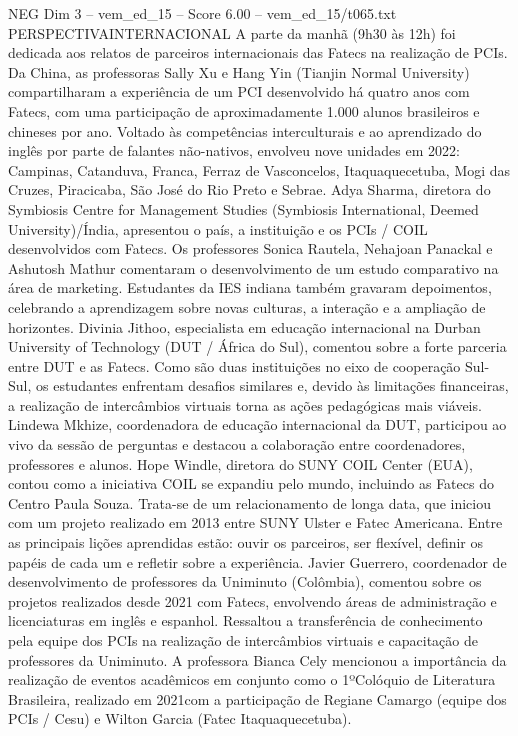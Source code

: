 \begin{textsample}{NEG Dim 3 – vem\_ed\_15 – Score 6.00 – vem\_ed\_15/t065.txt}  \label{ex:f3_neg_112}
PERSPECTIVAINTERNACIONAL A parte da manhã (9h30 às 12h) foi dedicada aos relatos de parceiros internacionais das Fatecs na realização de PCIs.
Da China, as professoras Sally Xu e Hang Yin (Tianjin Normal University) compartilharam a experiência de um PCI desenvolvido há quatro anos com Fatecs, com uma participação de aproximadamente 1.000 alunos brasileiros e chineses por ano.
Voltado às competências interculturais e ao aprendizado do inglês por parte de falantes não-nativos, envolveu nove unidades em 2022: Campinas, Catanduva, Franca, Ferraz de Vasconcelos, Itaquaquecetuba, Mogi das Cruzes, Piracicaba, São José do Rio Preto e Sebrae.
Adya Sharma, diretora do Symbiosis Centre for Management Studies (Symbiosis International, Deemed University)/Índia, apresentou o país, a instituição e os PCIs / COIL desenvolvidos com Fatecs.
Os professores Sonica Rautela, Nehajoan Panackal e Ashutosh Mathur comentaram o desenvolvimento de um estudo comparativo na área de marketing.
Estudantes da IES indiana também gravaram depoimentos, celebrando a aprendizagem sobre novas culturas, a interação e a ampliação de horizontes.
Divinia Jithoo, especialista em educação internacional na Durban University of Technology (DUT / África do Sul), comentou sobre a forte parceria entre DUT e as Fatecs.
Como são duas instituições no eixo de cooperação Sul-Sul, os estudantes enfrentam desafios similares e, devido às limitações financeiras, a realização de intercâmbios virtuais torna as ações pedagógicas mais viáveis.
Lindewa Mkhize, coordenadora de educação internacional da DUT, participou ao vivo da sessão de perguntas e destacou a colaboração entre coordenadores, professores e alunos.
Hope Windle, diretora do SUNY COIL Center (EUA), contou como a iniciativa COIL se expandiu pelo mundo, incluindo as Fatecs do Centro Paula Souza.
Trata-se de um relacionamento de longa data, que iniciou com um projeto realizado em 2013 entre SUNY Ulster e Fatec Americana.
Entre as principais lições aprendidas estão: ouvir os parceiros, ser flexível, definir os papéis de cada um e refletir sobre a experiência.
Javier Guerrero, coordenador de desenvolvimento de professores da Uniminuto (Colômbia), comentou sobre os projetos realizados desde 2021 com Fatecs, envolvendo áreas de administração e licenciaturas em inglês e espanhol.
Ressaltou a transferência de conhecimento pela equipe dos PCIs na realização de intercâmbios virtuais e capacitação de professores da Uniminuto.
A professora Bianca Cely mencionou a importância da realização de eventos acadêmicos em conjunto como o 1ºColóquio de Literatura Brasileira, realizado em 2021com a participação de Regiane Camargo (equipe dos PCIs / Cesu) e Wilton Garcia (Fatec Itaquaquecetuba).

\end{textsample}
